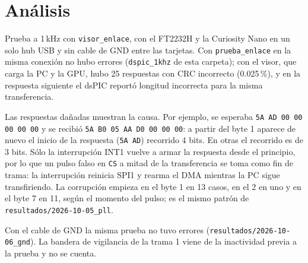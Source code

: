 \section{Análisis}

Prueba a 1\,kHz con \texttt{visor\_enlace}, con el FT2232H y la Curiosity
Nano en un solo hub USB y sin cable de GND entre las tarjetas. Con
\texttt{prueba\_enlace} en la misma conexión no hubo errores
(\texttt{dspic\_1khz} de esta carpeta); con el visor, que carga la PC y la
GPU, hubo 25 respuestas con CRC incorrecto (0.025\,\%), y en la respuesta
siguiente el dsPIC reportó longitud incorrecta para la misma transferencia.

Las respuestas dañadas muestran la causa. Por ejemplo, se esperaba
\texttt{5A AD 00 00 00 00 00} y se recibió \texttt{5A B0 05 AA D0 00 00 00}:
a partir del byte 1 aparece de nuevo el inicio de la respuesta
(\texttt{5A AD}) recorrido 4 bits. En otras el recorrido es de 3 bits. Sólo
la interrupción INT1 vuelve a armar la respuesta desde el principio, por lo
que un pulso falso en \texttt{CS} a mitad de la transferencia se toma como
fin de trama: la interrupción reinicia SPI1 y rearma el DMA mientras la PC
sigue transfiriendo. La corrupción empieza en el byte 1 en 13 casos, en el 2
en uno y en el byte 7 en 11, según el momento del pulso; es el mismo patrón
de \texttt{resultados/2026-10-05\_pll}.

Con el cable de GND la misma prueba no tuvo errores
(\texttt{resultados/2026-10-06\_gnd}). La bandera de vigilancia de la trama 1
viene de la inactividad previa a la prueba y no se cuenta.
